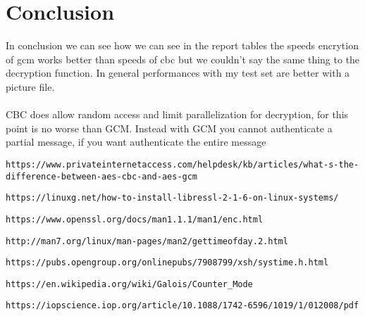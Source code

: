 \documentclass[11pt,a4paper]{article}
\begin{document}
\section{Conclusion}
In conclusion we can see how we can see in the report tables the speeds encrytion of gcm works better than speeds of cbc but we couldn't say the same thing to the decryption function.
In general performances with my test set are better with a picture file.
\\\\
CBC does allow random access and limit parallelization for decryption, for this point is no worse than GCM.
Instead with GCM you cannot authenticate a partial message, if you want authenticate the entire message
   \newpage 
    
    \begin{thebibliography}{}


\texttt{https://www.privateinternetaccess.com/helpdesk/kb/articles/what-s-the-difference-between-aes-cbc-and-aes-gcm}

\texttt{https://linuxg.net/how-to-install-libressl-2-1-6-on-linux-systems/}

\texttt{https://www.openssl.org/docs/man1.1.1/man1/enc.html}



\texttt{http://man7.org/linux/man-pages/man2/gettimeofday.2.html}


\texttt{https://pubs.opengroup.org/onlinepubs/7908799/xsh/systime.h.html}


    \texttt{https://en.wikipedia.org/wiki/Galois/Counter\_Mode}

\texttt{https://iopscience.iop.org/article/10.1088/1742-6596/1019/1/012008/pdf}
\end{thebibliography}
\end{document}
